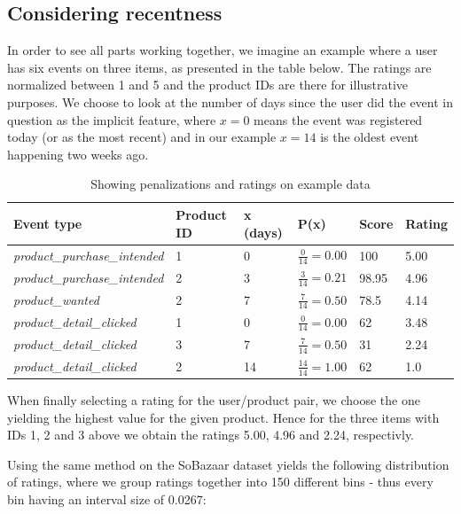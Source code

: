 \subsection{Considering recentness}

In order to see all parts working together, we imagine an example where a user
has six events on three items, as presented in the table below. The ratings are
normalized between 1 and 5 and the product IDs are there for illustrative
purposes. We choose to look at the number of days since the user did the event
in question as the implicit feature, where $x=0$ means the event was registered
today (or as the most recent) and in our example $x=14$ is the oldest event
happening two weeks ago.

\begin{table}[H]
  \centering
  \begin{tabular}{llllll}
  \toprule
  Event type & Product ID & x (days) & P(x) & Score & Rating \\
  \midrule
  \textit{product\_purchase\_intended}  & 1 & 0   & $\frac{0}{14} = 0.00$  & 100 & 5.00 \\[1.5ex]
  \textit{product\_purchase\_intended}  & 2 & 3   & $\frac{3}{14} = 0.21$  & 98.95 & 4.96 \\[1.5ex]
  \textit{product\_wanted}              & 2 & 7   & $\frac{7}{14} = 0.50$  & 78.5 & 4.14 \\[1.5ex]
  \textit{product\_detail\_clicked}     & 1 & 0   & $\frac{0}{14} = 0.00$  & 62 & 3.48 \\[1.5ex]
  \textit{product\_detail\_clicked}     & 3 & 7   & $\frac{7}{14} = 0.50$  & 31 & 2.24 \\[1.5ex]
  \textit{product\_detail\_clicked}     & 2 & 14  & $\frac{14}{14} = 1.00$ & 62 & 1.0  \\
  \bottomrule
  \end{tabular}
  \caption{Showing penalizations and ratings on example data}
  \label{implicit-ratings-example}
\end{table}

When finally selecting a rating for the user/product pair, we choose the
one yielding the highest value for the given product. Hence for the three items
with IDs 1, 2 and 3 above we obtain the ratings 5.00, 4.96 and 2.24, respectivly.

Using the same method on the SoBazaar dataset yields the following distribution
of ratings, where we group ratings together into 150 different bins - thus
every bin having an interval size of 0.0267:

